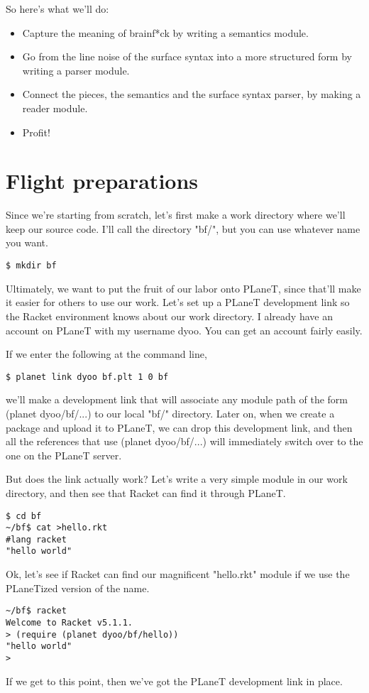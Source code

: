 \documentclass{article}
\begin{document}
So here's what we'll do:
\begin{itemize}
\item Capture the meaning of brainf*ck by writing a semantics module.

\item Go from the line noise of the surface syntax into a more structured form by writing a parser module.

\item Connect the pieces, the semantics and the surface syntax parser, by making a reader module.

\item Profit!
\end{itemize}


\section{Flight preparations}
Since we're starting from scratch, let's first make a work directory where we'll keep our source code. I'll call the directory "bf/", but you can use whatever name you want.
\begin{verbatim}
$ mkdir bf
\end{verbatim}
Ultimately, we want to put the fruit of our labor onto PLaneT, since that'll make it easier for others to use our work. Let's set up a PLaneT development link so the Racket environment knows about our work directory. I already have an account on PLaneT with my username dyoo. You can get an account fairly easily.

If we enter the following at the command line,
\begin{verbatim}
$ planet link dyoo bf.plt 1 0 bf
\end{verbatim}
we'll make a development link that will associate any module path of the form (planet dyoo/bf/...) to our local "bf/" directory. Later on, when we create a package and upload it to PLaneT, we can drop this development link, and then all the references that use (planet dyoo/bf/...) will immediately switch over to the one on the PLaneT server.


But does the link actually work? Let's write a very simple module in our work directory, and then see that Racket can find it through PLaneT.
\begin{verbatim}
$ cd bf
~/bf$ cat >hello.rkt
#lang racket
"hello world"
\end{verbatim}
Ok, let's see if Racket can find our magnificent "hello.rkt" module if we use the PLaneTized version of the name.
\begin{verbatim}
~/bf$ racket
Welcome to Racket v5.1.1.
> (require (planet dyoo/bf/hello))
"hello world"
>
\end{verbatim}
If we get to this point, then we've got the PLaneT development link in place.
\end{document}
